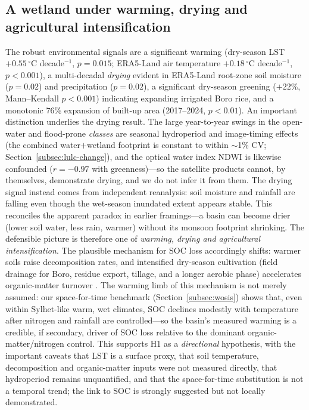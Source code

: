 \documentclass[preprint,authoryear,12pt]{elsarticle}
\begin{document}
\subsection{A wetland under warming, drying and agricultural intensification}
The robust environmental signals are a significant warming (dry-season LST $+0.55\,^{\circ}$C
decade$^{-1}$, $p=0.015$; ERA5-Land air temperature $+0.18\,^{\circ}$C decade$^{-1}$, $p<0.001$),
a multi-decadal \emph{drying} evident in ERA5-Land root-zone soil moisture ($p=0.02$) and
precipitation ($p=0.02$), a significant dry-season greening ($+22$\%, Mann--Kendall $p<0.001$)
indicating expanding irrigated Boro rice, and a monotonic $76$\% expansion of built-up area
(2017--2024, $p<0.01$). An important distinction underlies the drying result. The large
year-to-year swings in the open-water and flood-prone \emph{classes} are seasonal hydroperiod
and image-timing effects (the combined water$+$wetland footprint is constant to within
$\sim$1\% CV; Section~\ref{subsec:lulc-change}), and the optical water index NDWI is likewise
confounded ($r=-0.97$ with greenness)---so the satellite products cannot, by themselves,
demonstrate drying, and we do not infer it from them. The drying signal instead comes from
independent reanalysis: soil moisture and rainfall are falling even though the wet-season
inundated extent appears stable. This reconciles the apparent paradox in earlier framings---a
basin can become drier (lower soil water, less rain, warmer) without its monsoon footprint
shrinking. The defensible picture is therefore one of \emph{warming, drying and agricultural
intensification}. The plausible mechanism for SOC loss accordingly
shifts: warmer soils raise decomposition rates, and intensified dry-season cultivation
(field drainage for Boro, residue export, tillage, and a longer aerobic phase) accelerates
organic-matter turnover \citep{Chen2021}. The warming limb of this mechanism is not merely
assumed: our space-for-time benchmark (Section~\ref{subsec:wosis}) shows that, even within
Sylhet-like warm, wet climates, SOC declines modestly with temperature after nitrogen and
rainfall are controlled---so the basin's measured warming is a credible, if secondary, driver of
SOC loss relative to the dominant organic-matter/nitrogen control. This supports H1 as a \emph{directional}
hypothesis, with the important caveats that LST is a surface proxy, that soil temperature,
decomposition and organic-matter inputs were not measured directly, that hydroperiod remains
unquantified, and that the space-for-time substitution is not a temporal trend; the link to SOC
is strongly suggested but not locally demonstrated.
\end{document}
